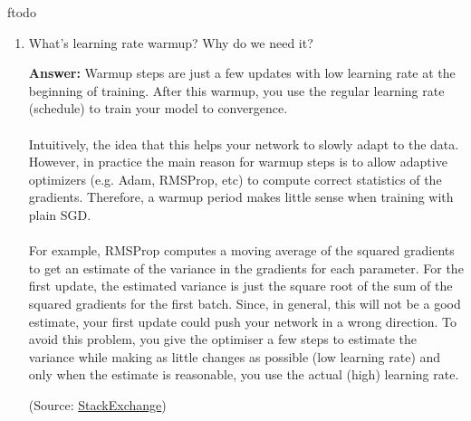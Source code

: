 ƒtodo\documentclass{article}
\newenvironment{QandA}{\begin{enumerate}[label=\arabic*.]}{\end{enumerate}}
\newenvironment{InnerQandA}{\begin{enumerate}[label=\roman*.]}{\end{enumerate}}
\newenvironment{answer}{\par\normalfont \textbf{Answer:}}{}
\begin{document}
\begin{QandA}
\begin{InnerQandA}
        \item What’s learning rate warmup? Why do we need it?
        \begin{answer}
            Warmup steps are just a few updates with low learning rate at the beginning of training. After this warmup, you use the regular learning rate (schedule) to train your model to convergence.\\\\
            Intuitively, the idea that this helps your network to slowly adapt to the data. However, in practice the main reason for warmup steps is to allow adaptive optimizers (e.g. Adam, RMSProp, etc) to compute correct statistics of the gradients. Therefore, a warmup period makes little sense when training with plain SGD. \\\\
            For example, RMSProp computes a moving average of the squared gradients to get an estimate of the variance in the gradients for each parameter. For the first update, the estimated variance is just the square root of the sum of the squared gradients for the first batch. Since, in general, this will not be a good estimate, your first update could push your network in a wrong direction. To avoid this problem, you give the optimiser a few steps to estimate the variance while making as little changes as possible (low learning rate) and only when the estimate is reasonable, you use the actual (high) learning rate.

            (Source: \href{https://datascience.stackexchange.com/questions/55991/in-the-context-of-deep-learning-what-is-training-warmup-steps}{StackExchange})
        \end{answer}
    \end{InnerQandA}


\end{QandA}
\end{document}
